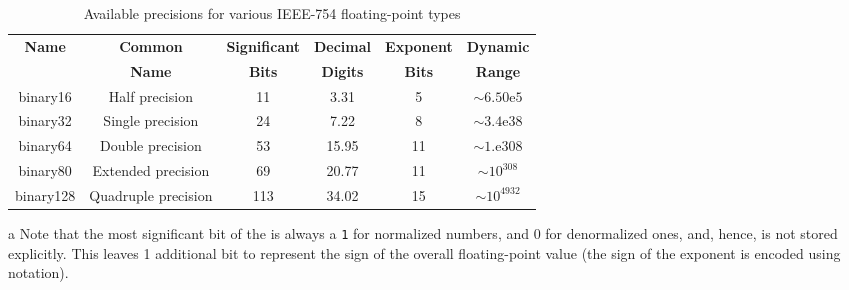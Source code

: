 \begin{table}[h!]
\begin{center}
\begin{threeparttable}
\caption{Available precisions for various IEEE-754 floating-point types}\label{digitseparator-table3}\vspace{1.5ex}
{\small \begin{tabular}{c|c|c|c|c|c}\thickhline
\rowcolor[gray]{.9}   {\sffamily\bfseries Name} & {\sffamily\bfseries Common} &
{\sffamily\bfseries Significant } & {\sffamily\bfseries Decimal }& {\sffamily\bfseries Exponent } & {\sffamily\bfseries Dynamic}\\
\rowcolor[gray]{.9}    & {\sffamily\bfseries Name} &
{\sffamily\bfseries Bits\tnote{a}} & {\sffamily\bfseries Digits}& {\sffamily\bfseries Bits} & {\sffamily\bfseries Range}\\ \hline
binary16 & Half precision & 11 & 3.31 & 5 & $\sim6.50\text{e}5$\\ \hline
binary32 & Single precision & 24 & 7.22 & 8 & $\sim3.4\text{e}38$\\ \hline
binary64 & Double precision & 53 & 15.95 & 11 & $\sim1.\text{e}308$\\ \hline
\rule{0pt}{3.5mm}binary80 & Extended precision & 69 & 20.77 & 11 & $\sim10^{308}$\\ \hline
\rule{0pt}{3.5mm}binary128 & Quadruple precision & 113 & 34.02 & 15 & $\sim10^{4932}$\\ \hline
\end{tabular}
} %
\begin{tablenotes}{\footnotesize
\item[a]{Note that the most significant bit of the 
is always a \lstinline!1! for normalized numbers, and 0 for denormalized ones, and,  hence, is not stored explicitly. This leaves 1
additional bit to represent the sign of the overall floating-point value
(the sign of the exponent is encoded using 
notation).}
} %
\end{tablenotes} %
\end{threeparttable}
\end{center}
\end{table}

